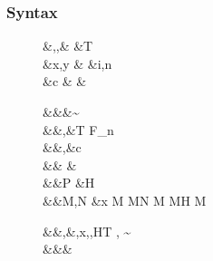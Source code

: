 \documentclass[manuscript,screen,nonacm]{acmart}
\begin{document}
\subsubsection{Syntax}
\begin{figure}[ht]
  \centering
  \begin{syntax}
     &\alpha,\beta,\gamma  &\qquad{} &T \\
     &x,y                  &\qquad{}        &i,n \in {} \\
     &c & &
  \end{syntax}
  \begin{syntax}
         &&\kappa       &\bnfeq \star \bnfor \kappa \to \kappa \bnfor \sigma \sim \tau\\
         &&\tau,\sigma  &\bnfeq \alpha \bnfor T \bnfor \tau \to \tau \bnfor \tau\App\tau \bnfor \Forall {\alpha\co\kappa} \tau \bnfor F_n\\
     &&\nu,\Co      &\bnfeq c \bnfor {}\tau \bnfor \sym\Co \bnfor \trans\nu\Co %
                                        \bnfor \Forall {\alpha\co\kappa} \Co \bnfor \Co\At\tau %
                                        \bnfor \nu\App\Co \bnfor \Left \Co \bnfor \Right \Co\\  %
     && \phi &\bnfeq \tau \bnfor \Co\\
      &&P    &\bnfeq H\App \many{\alpha\co\kappa} \\
         &&M,N  &\bnfeq x \bnfor  {} M \bnfor M\App N \bnfor \TLam{\tau\co\kappa} M \bnfor M\App \tau \bnfor H \bnfor \Case M  \bnfor \Cast \Tm \Co\\

    \end{syntax}
    \begin{syntax}
     &&\TEnv,\Delta &\bnfeq \empt \bnfor \TEnv,x\co\tau \bnfor \TEnv,\alpha\co\kappa \bnfor \TEnv,H\co T \bnfor \TEnv, \gamma \co \tau\sim\sigma\\
      &&\Subst       &\bnfeq \empt \bnfor \Set{\many{\alpha \mapsto \tau}}
  \end{syntax}


\end{figure}
\end{document}
